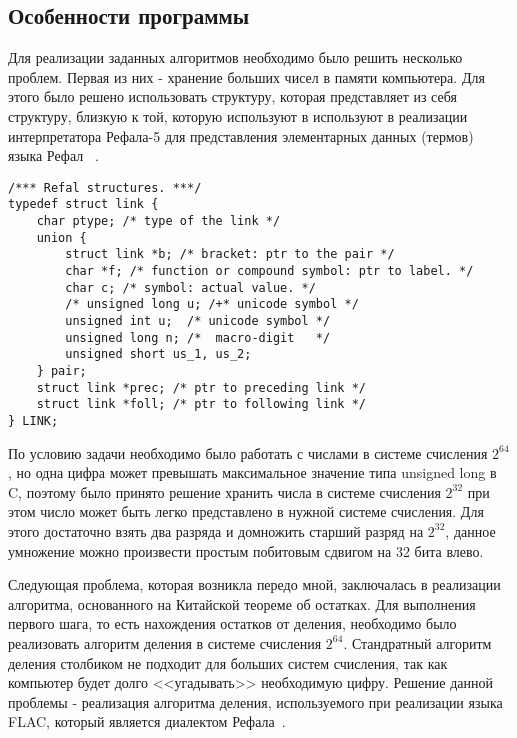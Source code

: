 \documentclass[14pt, russian]{scrartcl}
\begin{document}
\subsection{Особенности программы}
Для реализации заданных алгоритмов необходимо было решить несколько проблем. Первая из них - хранение больших чисел в памяти компьютера. Для этого было решено использовать структуру, которая представляет из себя структуру, близкую к той, которую используют в  используют в реализации интерпретатора Рефала-5 для представления элементарных данных (термов) языка Рефал ~\cite{Refal5}.
\label{lst:refal}
\begin{verbatim}
/*** Refal structures. ***/
typedef struct link {
    char ptype; /* type of the link */  
    union {
        struct link *b; /* bracket: ptr to the pair */
        char *f; /* function or compound symbol: ptr to label. */
        char c; /* symbol: actual value. */
        /* unsigned long u; /+* unicode symbol */
        unsigned int u;  /* unicode symbol */
        unsigned long n; /*  macro-digit   */
        unsigned short us_1, us_2;
    } pair;
    struct link *prec; /* ptr to preceding link */
    struct link *foll; /* ptr to following link */
} LINK;
\end{verbatim}

По условию задачи необходимо было работать с числами в системе счисления $2^{64}$, но одна цифра может превышать максимальное значение типа unsigned long в C, поэтому было принято решение хранить числа в системе счисления $2^{32}$ при этом число может быть легко представлено в нужной системе счисления. Для этого достаточно взять два разряда и домножить старший разряд на $2^{32}$, данное умножение можно произвести простым побитовым сдвигом на 32 бита влево.

Следующая проблема, которая возникла передо мной, заключалась в реализации алгоритма, основанного на Китайской теореме об остатках. Для выполнения первого шага, то есть нахождения остатков от деления, необходимо было реализовать алгоритм деления в системе счисления $2^{64}$. Стандратный алгоритм деления столбиком не подходит для больших систем счисления, так как компьютер будет долго <<угадывать>> необходимую цифру. Решение данной проблемы - реализация алгоритма деления, используемого при реализации языка FLAC, который является диалектом Рефала~\cite{FLAC}.
\noindent
\end{document}
